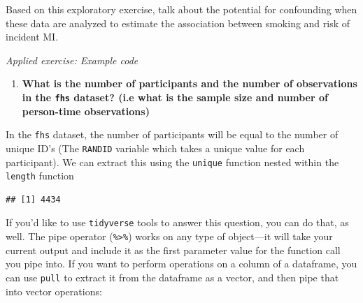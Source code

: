 \documentclass[
]{book}
\newenvironment{Shaded}{\begin{snugshade}}{\end{snugshade}}
\newcommand{\KeywordTok}[1]{\textcolor[rgb]{0.13,0.29,0.53}{\textbf{#1}}}
\newcommand{\NormalTok}[1]{#1}
\newcommand{\OperatorTok}[1]{\textcolor[rgb]{0.81,0.36,0.00}{\textbf{#1}}}
\newcommand{\StringTok}[1]{\textcolor[rgb]{0.31,0.60,0.02}{#1}}
\providecommand{\tightlist}{%
  \setlength{\itemsep}{0pt}\setlength{\parskip}{0pt}}
\begin{document}
Based on this exploratory exercise, talk about the potential
for confounding when these data are analyzed to estimate the association between
smoking and risk of incident MI.

\emph{Applied exercise: Example code}

\begin{enumerate}
\def\labelenumi{\arabic{enumi}.}
\tightlist
\item
  \textbf{What is the number of participants and the number of observations in the \texttt{fhs} dataset? (i.e what is the sample size and number of person-time observations)}
\end{enumerate}

In the \texttt{fhs} dataset, the number of participants will be equal to the number of unique ID's (The \texttt{RANDID} variable which takes a unique value for each participant). We can extract this using the \texttt{unique} function nested within the \texttt{length} function

\begin{Shaded}
\end{Shaded}

\begin{verbatim}
## [1] 4434
\end{verbatim}

If you'd like to use \texttt{tidyverse} tools to answer this question, you can do
that, as well. The pipe operator (\texttt{\%\textgreater{}\%}) works on any type of object---it will
take your current output and include it as the first parameter value for the
function call you pipe into. If you want to perform operations on a column of
a dataframe, you can use \texttt{pull} to extract it from the dataframe as a vector, and
then pipe that into vector operations:

\begin{Shaded}
\end{Shaded}
\end{document}
